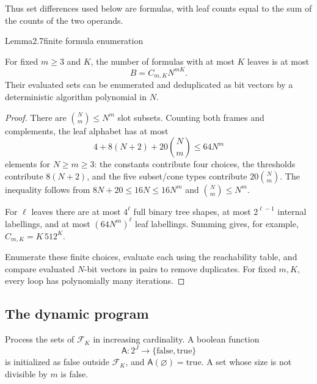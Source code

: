 Thus set differences used below are formulas, with leaf counts equal to the sum of the counts of the two operands.

\begin{numbered}{Lemma}{2.7}{finite formula enumeration}

For fixed \(m\geq3\) and \(K\), the number of formulas with at most \(K\) leaves is at most \[
B=C_{m,K}N^{mK}.
\tag{2.1}
\] Their evaluated sets can be enumerated and deduplicated as bit vectors by a deterministic algorithm polynomial in \(N\).

\end{numbered}

\begin{proof}
There are \(\binom Nm\leq N^m\) slot subsets. Counting both frames and complements, the leaf alphabet has at most \[4+8(N+2)+20\binom Nm\leq64N^m\] elements for \(N\geq m\geq3\): the constants contribute four choices, the thresholds contribute \(8(N+2)\), and the five subset/cone types contribute \(20\binom Nm\). The inequality follows from \(8N+20\leq16N\leq16N^m\) and \(\binom Nm\leq N^m\).

For \(\ell\) leaves there are at most \(4^\ell\) full binary tree shapes, at most \(2^{\ell-1}\) internal labellings, and at most \((64N^m)^\ell\) leaf labellings. Summing gives, for example, \(C_{m,K}=K\,512^K\).

Enumerate these finite choices, evaluate each using the reachability table, and compare evaluated \(N\)-bit vectors in pairs to remove duplicates. For fixed \(m,K\), every loop has polynomially many iterations.
\end{proof}

\subsection{The dynamic program}

Process the sets of \(\mathcal F_K\) in increasing cardinality. A boolean function \[
\mathsf A:2^J\longrightarrow\{\mathrm{false},\mathrm{true}\}
\] is initialized as false outside \(\mathcal F_K\), and \(\mathsf A(\varnothing)=\mathrm{true}\). A set whose size is not divisible by \(m\) is false.

